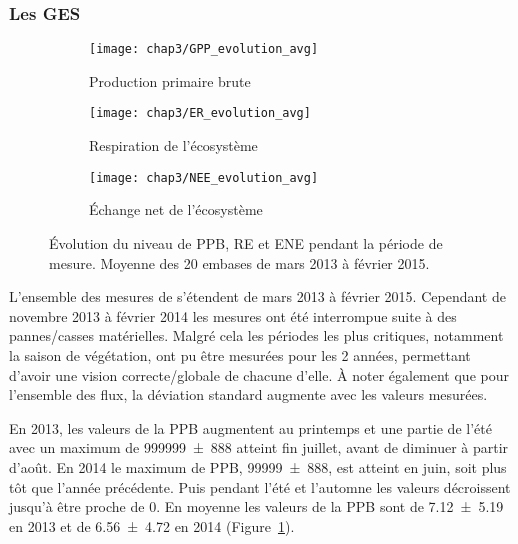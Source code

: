 \subsubsection{Les GES}


\begin{figure}
	\centering
	\begin{subfigure}[t]{\textwidth}
		\centering
		\texttt{[image: chap3/GPP\_evolution\_avg]}
		\caption{Production primaire brute}
		\label{fig:GPP_evolution_avg}
	\end{subfigure}%
	
	\begin{subfigure}[t]{\textwidth}
		\centering
		\texttt{[image: chap3/ER\_evolution\_avg]}
		\caption{Respiration de l'écosystème}
		\label{fig:ER_evolution_avg}
	\end{subfigure}
	
	\begin{subfigure}[t]{\textwidth}
		\centering
		\texttt{[image: chap3/NEE\_evolution\_avg]}
		\caption{Échange net de l'écosystème}
		\label{fig:NEE_evolution_avg}
	\end{subfigure}
\caption{Évolution du niveau de PPB, RE et ENE pendant la période de mesure. Moyenne des 20 embases de mars 2013 à février 2015.}
\label{fig:flux_evolution_avg}
\end{figure}

L'ensemble des mesures de \coo s'étendent de mars 2013 à février 2015.
Cependant de novembre 2013 à février 2014 les mesures ont été interrompue suite à des pannes/casses matérielles.
Malgré cela les périodes les plus critiques, notamment la saison de végétation, ont pu être mesurées pour les 2 années, permettant d'avoir une vision correcte/globale de chacune d'elle.
À noter également que pour l'ensemble des flux, la déviation standard augmente avec les valeurs mesurées.

En 2013, les valeurs de la PPB augmentent au printemps et une partie de l'été avec un maximum de \SI{999999(888)}{\uml} atteint fin juillet, avant de diminuer à partir d'août.
En 2014 le maximum de PPB, \SI{99999(888)}{\uml}, est atteint en juin, soit plus tôt que l'année précédente.
Puis pendant l'été et l'automne les valeurs décroissent jusqu'à être proche de 0.
En moyenne les valeurs de la PPB sont de \SI{7.12(519)}{\uml} en 2013 et de \SI{6.56(472)}{\uml} en 2014 (Figure~\ref{fig:GPP_evolution_avg}).


